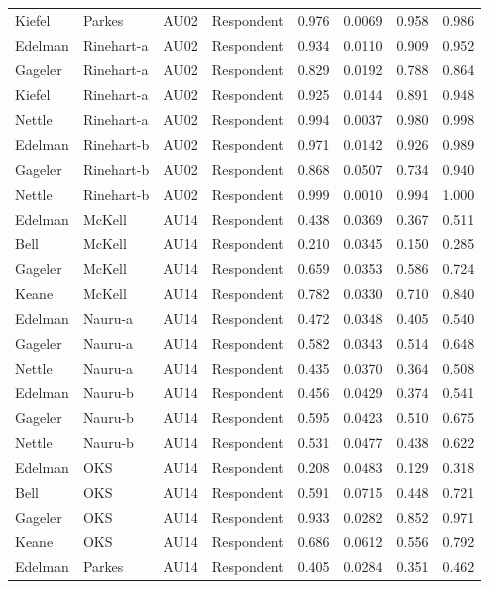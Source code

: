 \documentclass{monashthesis}
\begin{document}
\begin{center}
\begin{longtable}{llllllll}
Kiefel & Parkes & AU02 & Respondent & 0.976 & 0.0069 & 0.958 & 0.986 \\
Edelman & Rinehart-a & AU02 & Respondent & 0.934 & 0.0110 & 0.909 & 0.952 \\
Gageler & Rinehart-a & AU02 & Respondent & 0.829 & 0.0192 & 0.788 & 0.864 \\
Kiefel & Rinehart-a & AU02 & Respondent & 0.925 & 0.0144 & 0.891 & 0.948 \\
Nettle & Rinehart-a & AU02 & Respondent & 0.994 & 0.0037 & 0.980 & 0.998 \\
Edelman & Rinehart-b & AU02 & Respondent & 0.971 & 0.0142 & 0.926 & 0.989 \\
Gageler & Rinehart-b & AU02 & Respondent & 0.868 & 0.0507 & 0.734 & 0.940 \\
Nettle & Rinehart-b & AU02 & Respondent & 0.999 & 0.0010 & 0.994 & 1.000 \\
Edelman & McKell & AU14 & Respondent & 0.438 & 0.0369 & 0.367 & 0.511 \\
Bell & McKell & AU14 & Respondent & 0.210 & 0.0345 & 0.150 & 0.285 \\
Gageler & McKell & AU14 & Respondent & 0.659 & 0.0353 & 0.586 & 0.724 \\
Keane & McKell & AU14 & Respondent & 0.782 & 0.0330 & 0.710 & 0.840 \\
Edelman & Nauru-a & AU14 & Respondent & 0.472 & 0.0348 & 0.405 & 0.540 \\
Gageler & Nauru-a & AU14 & Respondent & 0.582 & 0.0343 & 0.514 & 0.648 \\
Nettle & Nauru-a & AU14 & Respondent & 0.435 & 0.0370 & 0.364 & 0.508 \\
Edelman & Nauru-b & AU14 & Respondent & 0.456 & 0.0429 & 0.374 & 0.541 \\
Gageler & Nauru-b & AU14 & Respondent & 0.595 & 0.0423 & 0.510 & 0.675 \\
Nettle & Nauru-b & AU14 & Respondent & 0.531 & 0.0477 & 0.438 & 0.622 \\
Edelman & OKS & AU14 & Respondent & 0.208 & 0.0483 & 0.129 & 0.318 \\
Bell & OKS & AU14 & Respondent & 0.591 & 0.0715 & 0.448 & 0.721 \\
Gageler & OKS & AU14 & Respondent & 0.933 & 0.0282 & 0.852 & 0.971 \\
Keane & OKS & AU14 & Respondent & 0.686 & 0.0612 & 0.556 & 0.792 \\
Edelman & Parkes & AU14 & Respondent & 0.405 & 0.0284 & 0.351 & 0.462 \\

\end{longtable}
\end{center}
\end{document}
